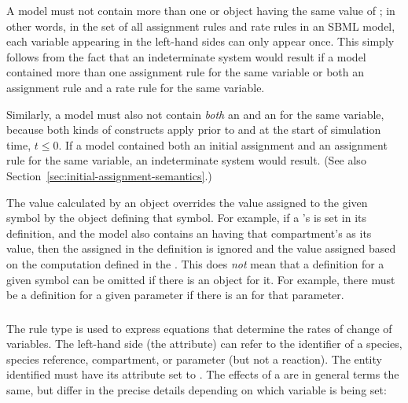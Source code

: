 A model must not contain more than one \AssignmentRule or
\RateRule object having the same value of ; in
other words, in the set of all assignment rules and rate rules in
an SBML model, each variable appearing in the left-hand sides can
only appear once.  This simply follows from the fact that an
indeterminate system would result if a model contained more than
one assignment rule for the same variable or both an assignment
rule and a rate rule for the same variable.

Similarly, a model must also not contain \emph{both} an
\AssignmentRule and an \InitialAssignment for the same variable,
because both kinds of constructs apply prior to and at the start
of simulation time, \ie $t \leq 0$.  If a model contained both an
initial assignment and an assignment rule for the same variable,
an indeterminate system would result.  (See also
Section~\ref{sec:initial-assignment-semantics}.)

The value calculated by an \AssignmentRule object overrides the
value assigned to the given symbol by the object defining that
symbol.  For example, if a \Compartment's  is set in
its definition, and the model also contains an \AssignmentRule
having that compartment's  as its 
value, then the  assigned in the \Compartment
definition is ignored and the value assigned based on the
computation defined in the \AssignmentRule.  This does \emph{not}
mean that a definition for a given symbol can be omitted if there
is an \AssignmentRule object for it.  For example, there must be a
\Parameter definition for a given parameter if there is an
\AssignmentRule for that parameter.


\subsubsection{}
\label{sec:raterule}

The rule type \RateRule is used to express equations that
determine the rates of change of variables.  The left-hand side
(the  attribute) can refer to the identifier of a
species, species reference, compartment, or parameter (but not a 
reaction).  The
entity identified must have its  attribute set to
.  The effects of a \RateRule are in general terms the
same, but differ in the precise details depending on which
variable is being set:

